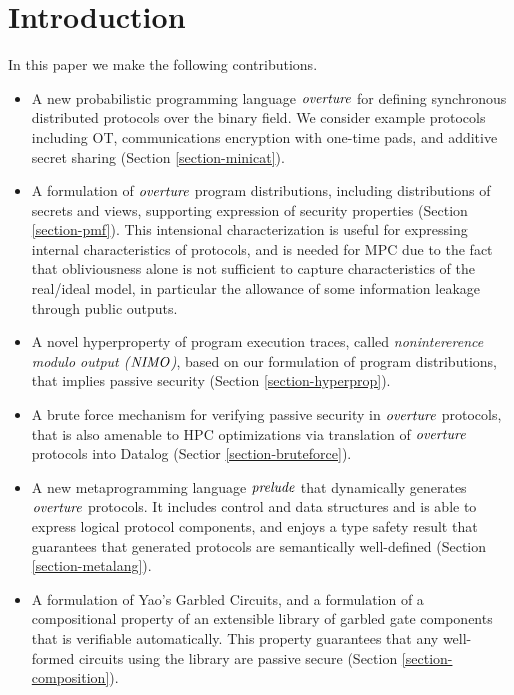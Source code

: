 \section{Introduction}

In this paper we make the following contributions.
\begin{itemize}
\item A new probabilistic programming language $\mathit{overture}$ for defining
  synchronous distributed protocols over the binary field. We consider example
  protocols including OT, communications encryption with one-time
  pads, and additive secret sharing (Section \ref{section-minicat}).
\item A formulation of $\mathit{overture}$ program distributions, including
  distributions of secrets and views, supporting expression of security
  properties (Section \ref{section-pmf}). This intensional characterization
  is useful for expressing internal characteristics of protocols, and
  is needed for MPC due to the fact that obliviousness alone is not sufficient
  to capture characteristics of the real/ideal model, in particular the
  allowance of some information leakage through public outputs. 
\item A novel hyperproperty of program execution traces, called
  \emph{nonintererence modulo output ($\mathit{NIMO}$)}, based on our
  formulation of program distributions, that implies passive security
  (Section \ref{section-hyperprop}).
\item A brute force mechanism for verifying passive security in
  $\mathit{overture}$ protocols, that is also amenable to HPC optimizations via
  translation of $\mathit{overture}$ protocols into Datalog (Sectior \ref{section-bruteforce}). 
\item A new metaprogramming language $\mathit{prelude}$ that dynamically
  generates $\mathit{overture}$ protocols. It includes control and data structures
  and is able to express logical protocol components, and enjoys a
  type safety result that guarantees that generated protocols
  are semantically well-defined (Section \ref{section-metalang}).
\item A formulation of Yao's Garbled Circuits, and a formulation of a
  compositional property of an extensible library of garbled gate
  components that is verifiable automatically. This property
  guarantees that any well-formed circuits using the library are
  passive secure (Section \ref{section-composition}).
\end{itemize}

